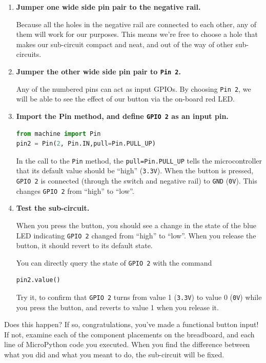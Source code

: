 \begin{enumerate}
	\item  \textbf{Jumper one wide side pin pair to the negative rail.}

	Because all the holes in the negative rail are connected to each other, any of them will work for our purposes. This means we're free to choose a hole that makes our sub-circuit compact and neat, and out of the way of other sub-circuits.

	\item  \textbf{Jumper the other wide side pin pair to \texttt{Pin 2}.}

	Any of the numbered pins can act as input GPIOs. By choosing \texttt{Pin 2}, we will be able to see the effect of our button via the on-board red LED.


	\item \textbf{Import the Pin method, and define \texttt{GPIO 2} as an input pin.}
\begin{lstlisting}[language=Python]
from machine import Pin
pin2 = Pin(2, Pin.IN,pull=Pin.PULL_UP)
\end{lstlisting}
	In the call to the \texttt{Pin} method, the \texttt{pull=Pin.PULL\_UP} tells the microcontroller that its default value should be ``high'' (\texttt{3.3V}). When the button is pressed, \texttt{GPIO 2} is connected (through the switch and negative rail) to \texttt{GND} (\texttt{0V}). This changes \texttt{GPIO 2} from ``high'' to ``low''.

	\item \textbf{Test the sub-circuit.}

	When you press the button, you should see a change in the state of the blue LED indicating \texttt{GPIO 2} changed from ``high'' to ``low''.
	When you release the button, it should revert to its default state.

	You can directly query the state of \texttt{GPIO 2} with the command
\begin{lstlisting}[language=Python]
pin2.value()
\end{lstlisting}
	Try it, to confirm that \texttt{GPIO 2} turns from value 1 (\texttt{3.3V}) to value 0 (\texttt{0V}) while you press the button, and reverts to value 1 when you release it.

\end{enumerate}
Does this happen?
If so, congratulations, you've made a functional button input!
If not, examine each of the component placements on the breadboard, and each line of MicroPython code you executed.
When you find the difference between what you did and what you meant to do, the sub-circuit will be fixed.


